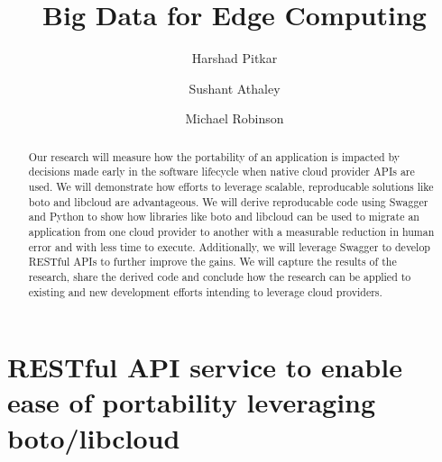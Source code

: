 
\title{Big Data for Edge Computing}


\author{Harshad Pitkar}

\author{Sushant Athaley}

\author{Michael Robinson}


\renewcommand{\shortauthors}{G. v. Laszewski}


\begin{abstract}
Our research will measure how the portability of an application is
impacted by decisions made early in the software lifecycle when native
cloud provider APIs are used. We will demonstrate how efforts to
leverage scalable, reproducable solutions like boto and libcloud are
advantageous. We will derive reproducable code using Swagger and Python
to show how libraries like boto and libcloud can be used to migrate an
application from one cloud provider to another with a measurable
reduction in human error and with less time to execute. Additionally, we
will leverage Swagger to develop RESTful APIs to further improve the
gains. We will capture the results of the research, share the derived
code and conclude how the research can be applied to existing and new
development efforts intending to leverage cloud providers. 
\end{abstract}



\maketitle

\section{RESTful API service to enable ease of portability leveraging
  boto/libcloud}

